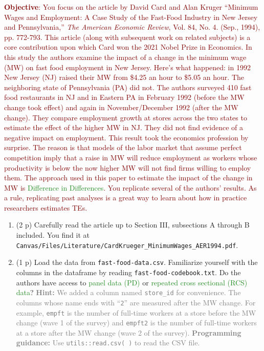 \documentclass[
]{article}
\begin{document}
\noindent \textcolor{Maroon}{\textbf{Objective}: You focus on the article by David Card and Alan Kruger ``Minimum Wages and Employment: A Case Study of the Fast-Food Industry in New Jersey and Pennsylvania,'' \textit{The American Economic Review}, Vol. 84, No. 4. (Sep., 1994), pp. 772-793. This article (along with subsequent work on related subjects) is a core contribution upon which Card won the 2021 Nobel Prize in Economics. In this study the authors examine the impact of a change in the minimum wage (MW) on fast food employment in New Jersey. Here's what happened: in 1992 New Jersey (NJ) raised their MW from \$4.25 an hour to \$5.05 an hour. The neighboring state of Pennsylvania (PA) did not. The authors surveyed 410 fast food restaurants in NJ and in Eastern PA in February 1992 (before the MW change took effect) and again in November/December 1992 (after the MW change). They compare employment growth at stores across the two states to estimate the effect of the higher MW in NJ. They did not find evidence of a negative impact on employment. This result took the economics profession by surprise. The reason is that models of the labor market that assume perfect competition imply that a raise in MW will reduce employment as workers whose productivity is below the now higher MW will not find firms willing to employ them. The approach used in this paper to estimate the impact of the change in MW is \textcolor{ForestGreen}{Difference in Differences}. You replicate several of the authors' results. As a rule, replicating past analyses is a great way to learn about how in practice researchers estimates TEs.}

\begin{enumerate}
\def\labelenumi{\arabic{enumi}.}
\setcounter{enumi}{8}
\item
  (2 p) Carefully read the article up to Section III, subsections A
  through B included. You find it at
  \newline \texttt{Canvas/Files/Literature/CardKrueger\_MinimumWages\_AER1994.pdf}.
\item
  (1 p) Load the data from \texttt{fast-food-data.csv}. Familiarize
  yourself with the columns in the dataframe by reading
  \texttt{fast-food-codebook.txt}. Do the authors have access to
  \textcolor{ForestGreen}{panel data (PD)} or
  \textcolor{ForestGreen}{repeated cross sectional (RCS) data}?
  \textcolor{gray}{\textbf{Hint:} We added a column named \texttt{store\_id} for convenience. The columns whose name ends with ``\texttt{2}'' are measured after the MW change. For example, \texttt{empft} is the number of full-time workers at a store before the MW change (wave 1 of the survey) and \texttt{empft2} is the number of full-time workers at a store after the MW change (wave 2 of the survey).}
  \textcolor{gray}{\textbf{Programming guidance:} Use \texttt{utils::read.csv( )} to read the CSV file.}
\end{enumerate}
\end{document}
